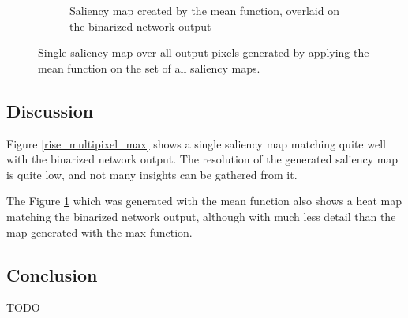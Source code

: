 \begin{figure}[H]
\begin{subfigure}[t]{.4\textwidth}
        \caption{Saliency map created by the mean function, overlaid on the binarized network output}
    \end{subfigure}
    \caption{Single saliency map over all output pixels generated by applying the mean function on the set of all saliency maps.}
    \label{rise_multipixel_mean}
\end{figure}

\subsection{Discussion}
Figure \ref{rise_multipixel_max} shows a single saliency map matching quite well with the binarized network output. The resolution of the generated saliency map
is quite low, and not many insights can be gathered from it.

The Figure \ref{rise_multipixel_mean} which was generated with the mean function also shows a heat map matching the binarized network output, although with much less detail than the map generated with the max function.

\subsection{Conclusion}
TODO